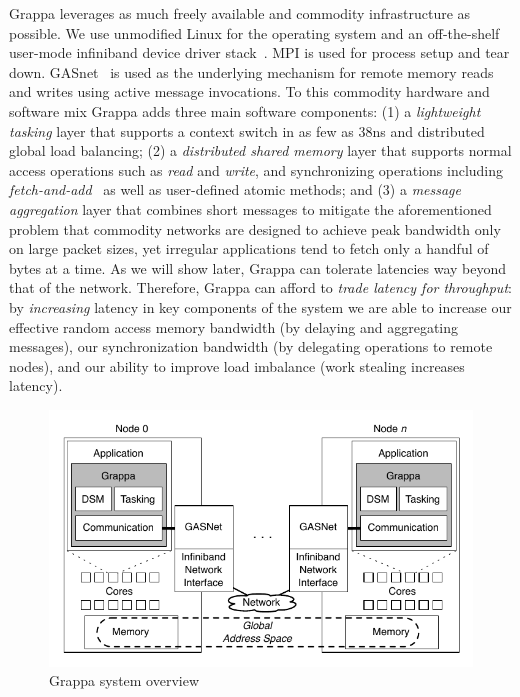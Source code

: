 Grappa leverages as much freely available and commodity infrastructure as possible. We use unmodified Linux for the operating system and an off-the-shelf user-mode infiniband device driver stack~\cite{OFED}. MPI is used for process setup and tear down. GASnet~\cite{gasnet} is used as the underlying mechanism for remote memory reads and writes using active message invocations. To this commodity hardware and software mix Grappa adds three main software components: (1) a \emph{lightweight tasking\/} layer that supports a context switch in as few as 38ns and distributed global load balancing; (2) a \emph{distributed shared memory\/} layer that supports normal access operations such as \emph{read\/} and \emph{write\/}, and synchronizing operations including \emph{fetch-and-add\/}~\cite{fetchandadd} as well as user-defined atomic methods; and (3) a \emph{message aggregation\/} layer that combines short messages to mitigate the aforementioned problem that commodity networks are designed to achieve peak bandwidth only on large packet sizes, yet irregular applications tend to fetch only a handful of bytes at a time. As we will show later, Grappa can tolerate latencies way beyond that of the network. Therefore, Grappa can afford to \emph{trade latency for throughput\/}: by {\em increasing\/} latency in key components of the system we are able to increase our effective random access memory bandwidth (by delaying and aggregating messages), our synchronization bandwidth (by delegating operations to remote nodes), and our ability to improve load imbalance (work stealing increases latency).

\begin{figure}[t]
\begin{center}     
  \includegraphics[width=0.95\columnwidth]{figs/system-overview}
\begin{minipage}{0.95\columnwidth} 
  \caption{\label{fig:grappa} Grappa system overview}
\end{minipage}
\vspace{-3ex}
\end{center}
\end{figure}

